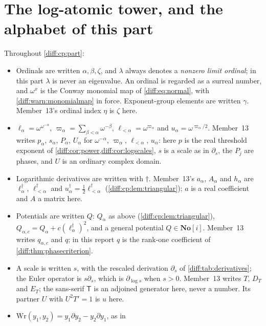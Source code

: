 \documentclass[11pt,letterpaper]{article}
\numberwithin{equation}{section}
\theoremstyle{definition}
\theoremstyle{remark}
\newcommand{\SC}{\mathbf{No}[i]}
\newcommand{\der}{\partial}
\begin{document}
\section{The log-atomic tower, and the alphabet of this part}
\label{diff:cp:sec:tower}

\begin{convention}
\label{diff:cp:conv:alphabet}
Throughout \cref{diff:cp:part}:
\begin{itemize}[leftmargin=1.6em]
\item Ordinals are written $\alpha,\beta,\zeta$, and $\lambda$ always denotes a
\emph{nonzero limit ordinal}; in this part $\lambda$ is never an eigenvalue.
An ordinal is regarded as a surreal number, and $\omega^{x}$ is the Conway
monomial map of \cref{diff:eq:normal}, with \cref{diff:warn:monomialmap} in
force. Exponent-group elements are written $\gamma$. Member~13's ordinal index
$\eta$ is $\zeta$ here.
\item $\ell_{\alpha}=\omega^{\omega^{-\alpha}}$,
$\varpi_{\alpha}=\sum_{\beta<\alpha}\omega^{-\beta}$,
$\ell_{<\alpha}=\omega^{\varpi_{\alpha}}$ and
$u_{\alpha}=\omega^{\varpi_{\alpha}/2}$. Member~13 writes $p_{\alpha}$,
$s_{\alpha}$, $P_{\alpha}$, $U_{\alpha}$ for $\omega^{-\alpha}$,
$\varpi_{\alpha}$, $\ell_{<\alpha}$, $u_{\alpha}$: here $p$ is the real
threshold exponent of \cref{diff:cor:power,diff:cor:logscales}, $s$ is a scale
as in $\der_{s}$, the $P_{j}$ are phases, and $U$ is an ordinary complex domain.
\item Logarithmic derivatives are written with $\dagger$. Member~13's
$a_{\alpha}$, $A_{\alpha}$ and $h_{\alpha}$ are $\ell_{\alpha}^{\dagger}$,
$\ell_{<\alpha}^{\dagger}$ and $u_{\alpha}^{\dagger}=\frac12\ell_{<\alpha}^{\dagger}$
(\cref{diff:cp:lem:triangular}); $a$ is a real coefficient and $A$ a matrix here.
\item Potentials are written $Q$: $Q_{\alpha}$ as above (\cref{diff:cp:lem:triangular}),
$Q_{\alpha,c}=Q_{\alpha}+c(\ell_{\alpha}^{\dagger})^{2}$, and a general
potential $Q\in\SC$. Member~13 writes $q_{\alpha,c}$ and $q$; in this report
$q$ is the rank-one coefficient of \cref{diff:thm:phasecriterion}.
\item A scale is written $s$, with the rescaled derivation $\der_{s}$ of
\cref{diff:tab:derivatives}; the Euler operator is $s\der_{s}$, which is
$\der_{\log s}$ when $s>0$. Member~13 writes $T$, $D_{T}$ and $E_{T}$; the
sans-serif $\mathsf T$ is an adjoined generator here, never a number. Its
partner $U$ with $U^{2}T'=1$ is $u$ here.
\item $\mathrm{Wr}(y_{1},y_{2})=y_{1}\der y_{2}-y_{2}\der y_{1}$, as in

\end{itemize}
\end{convention}
\end{document}
